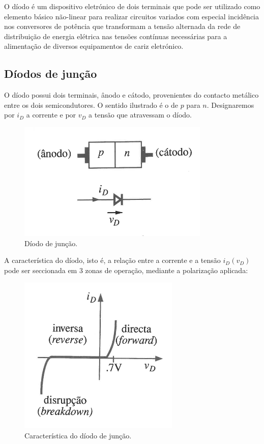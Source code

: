 
\noindent O díodo é um dispositivo eletrónico de dois terminais que pode ser utilizado como elemento básico não-linear para realizar circuitos variados com especial incidência nos conversores de potência que transformam a tensão alternada da rede de distribuição de energia elétrica nas tensões contínuas necessárias para a alimentação de diversos equipamentos de cariz eletrónico.

\subsection[2.1 Díodos de junção]{\hspace*{0.075 em}\raisebox{0.2 em}{$\pmb{\drsh}$} Díodos de junção}
\label{subsec:junction-diode}
\noindent O díodo possui dois terminais, ânodo e cátodo, provenientes do contacto metálico entre os dois semicondutores. O sentido ilustrado é o de $p$ para $n$. Designaremos por $i_D$ a corrente e por $v_D$ a tensão que atravessam o díodo.

\begin{figure}[H]
    \centering
    \includegraphics[width = 0.45\linewidth]{img/2/diode.png}
    \caption{Díodo de junção.}
    \label{fig:diode}
\end{figure}

\noindent A característica do díodo, isto é, a relação entre a corrente e a tensão $i_D(v_D)$ pode ser seccionada em 3 zonas de operação, mediante a polarização aplicada\footnotemark:

\vspace{-0.5 em}
\begin{figure}[H]
    \centering
    \includegraphics[width = 0.4\linewidth]{img/2/curve.png}
    \caption{Característica do díodo de junção.}
    \label{fig:curve}
\end{figure}


